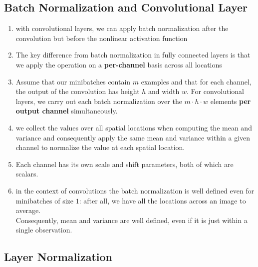 \subsection{Batch Normalization and Convolutional Layer \cite{dnn-1}}

\begin{enumerate}
    \item with convolutional layers, we can apply batch normalization after the convolution but before the nonlinear activation function

    \item The key difference from batch normalization in fully connected layers is that we apply the operation on a \textbf{per-channel} basis across all locations

    \item Assume that our minibatches contain $m$ examples and that for each channel, the output of the convolution has height $h$ and width $w$. For convolutional layers, we carry out each batch normalization over the $m\cdot h\cdot w$ elements \textbf{per output channel} simultaneously. 
    
    \item we collect the values over all spatial locations when computing the mean and variance and consequently apply the same mean and variance within a given channel to normalize the value at each spatial location. 
    
    \item Each channel has its own scale and shift parameters, both of which are scalars.

    \item in the context of convolutions the batch normalization is well defined even for minibatches of size $1$: after all, we have all the locations across an image to average.\\
    Consequently, mean and variance are well defined, even if it is just within a single observation.
\end{enumerate}


\subsection{Layer Normalization \cite{dnn-1}}

